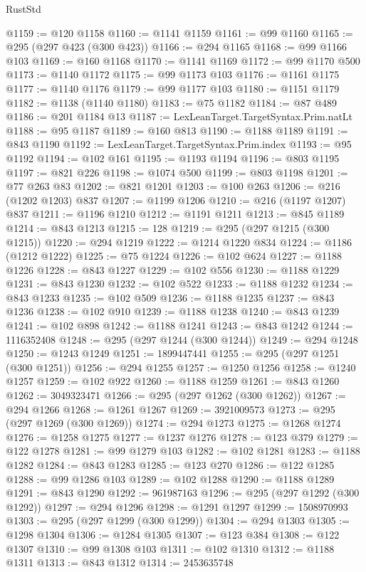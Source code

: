 \begin{lexlean}{RustStd}
\begin{coremodule}
{\begin{coremodule}
{{{{{{{{{{{{{{{{{{{{{{{{{{{{{{{{{@1159 := @120 @1158
@1160 := @1141 @1159
@1161 := @99 @1160
@1165 := @295 (@297 @423 (@300 @423))
@1166 := @294 @1165
@1168 := @99 @1166 @103
@1169 := @160 @1168
@1170 := @1141 @1169
@1172 := @99 @1170 @500
@1173 := @1140 @1172
@1175 := @99 @1173 @103
@1176 := @1161 @1175
@1177 := @1140 @1176
@1179 := @99 @1177 @103
@1180 := @1151 @1179
@1182 := @1138 (@1140 @1180)
@1183 := @75 @1182
@1184 := @87 @489
@1186 := @201 @1184 @13
@1187 := LexLeanTarget.TargetSyntax.Prim.natLt
@1188 := @95 @1187
@1189 := @160 @813
@1190 := @1188 @1189
@1191 := @843 @1190
@1192 := LexLeanTarget.TargetSyntax.Prim.index
@1193 := @95 @1192
@1194 := @102 @161
@1195 := @1193 @1194
@1196 := @803 @1195
@1197 := @821 @226
@1198 := @1074 @500
@1199 := @803 @1198
@1201 := @77 @263 @83
@1202 := @821 @1201
@1203 := @100 @263
@1206 := @216 (@1202 @1203) @837
@1207 := @1199 @1206
@1210 := @216 (@1197 @1207) @837
@1211 := @1196 @1210
@1212 := @1191 @1211
@1213 := @845 @1189
@1214 := @843 @1213
@1215 := 128
@1219 := @295 (@297 @1215 (@300 @1215))
@1220 := @294 @1219
@1222 := @1214 @1220 @834
@1224 := @1186 (@1212 @1222)
@1225 := @75 @1224
@1226 := @102 @624
@1227 := @1188 @1226
@1228 := @843 @1227
@1229 := @102 @556
@1230 := @1188 @1229
@1231 := @843 @1230
@1232 := @102 @522
@1233 := @1188 @1232
@1234 := @843 @1233
@1235 := @102 @509
@1236 := @1188 @1235
@1237 := @843 @1236
@1238 := @102 @910
@1239 := @1188 @1238
@1240 := @843 @1239
@1241 := @102 @898
@1242 := @1188 @1241
@1243 := @843 @1242
@1244 := 1116352408
@1248 := @295 (@297 @1244 (@300 @1244))
@1249 := @294 @1248
@1250 := @1243 @1249
@1251 := 1899447441
@1255 := @295 (@297 @1251 (@300 @1251))
@1256 := @294 @1255
@1257 := @1250 @1256
@1258 := @1240 @1257
@1259 := @102 @922
@1260 := @1188 @1259
@1261 := @843 @1260
@1262 := 3049323471
@1266 := @295 (@297 @1262 (@300 @1262))
@1267 := @294 @1266
@1268 := @1261 @1267
@1269 := 3921009573
@1273 := @295 (@297 @1269 (@300 @1269))
@1274 := @294 @1273
@1275 := @1268 @1274
@1276 := @1258 @1275
@1277 := @1237 @1276
@1278 := @123 @379
@1279 := @122 @1278
@1281 := @99 @1279 @103
@1282 := @102 @1281
@1283 := @1188 @1282
@1284 := @843 @1283
@1285 := @123 @270
@1286 := @122 @1285
@1288 := @99 @1286 @103
@1289 := @102 @1288
@1290 := @1188 @1289
@1291 := @843 @1290
@1292 := 961987163
@1296 := @295 (@297 @1292 (@300 @1292))
@1297 := @294 @1296
@1298 := @1291 @1297
@1299 := 1508970993
@1303 := @295 (@297 @1299 (@300 @1299))
@1304 := @294 @1303
@1305 := @1298 @1304
@1306 := @1284 @1305
@1307 := @123 @384
@1308 := @122 @1307
@1310 := @99 @1308 @103
@1311 := @102 @1310
@1312 := @1188 @1311
@1313 := @843 @1312
@1314 := 2453635748
}}}}}}}}}}}}}}}}}}}}}}}}}}}}}}}}}
\end{coremodule}}
\end{coremodule}
\end{lexlean}
